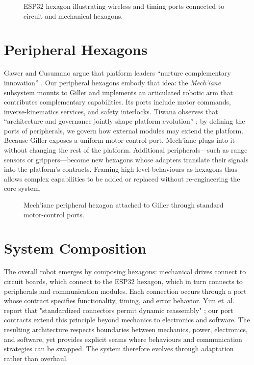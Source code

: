 \begin{figure}[H]
  \centering
  \fbox{\rule{0pt}{2in} \rule{3in}{0pt}}
  \caption{ESP32 hexagon illustrating wireless and timing ports connected to circuit and mechanical hexagons.}
  \label{fig:mcu_hex}
\end{figure}

\section{Peripheral Hexagons}
Gawer and Cusumano argue that platform leaders ``nurture complementary innovation'' \cite{gawer2002platformleadership}. Our
peripheral hexagons embody that idea: the \emph{Mech'iane} subsystem mounts to Giller and implements an articulated robotic arm
that contributes complementary capabilities. Its ports include motor commands, inverse-kinematics services, and safety
interlocks. Tiwana observes that ``architecture and governance jointly shape platform evolution'' \cite{tiwana2014platformecosystems};
by defining the ports of peripherals, we govern how external modules may extend the platform. Because Giller exposes a uniform
motor-control port, Mech'iane plugs into it without changing the rest of the platform. Additional peripherals—such as range
sensors or grippers—become new hexagons whose adapters translate their signals into the platform's contracts. Framing
high-level behaviours as hexagons thus allows complex capabilities to be added or replaced without re-engineering the core system.

\begin{figure}[H]
  \centering
  \fbox{\rule{0pt}{2in} \rule{3in}{0pt}}
  \caption{Mech'iane peripheral hexagon attached to Giller through standard motor-control ports.}
  \label{fig:peripheral_hex}
\end{figure}

\section{System Composition}
The overall robot emerges by composing hexagons: mechanical drives connect to circuit boards, which connect to the ESP32 hexagon, which in turn connects to peripherals and communication modules. Each connection occurs through a port whose contract specifies functionality, timing, and error behavior. Yim et~al. report that "standardized connectors permit dynamic reassembly" \cite{Yim2007}; our port contracts extend this principle beyond mechanics to electronics and software. The resulting architecture respects boundaries between mechanics, power, electronics, and software, yet provides explicit seams where behaviours and communication strategies can be swapped. The system therefore evolves through adaptation rather than overhaul.

